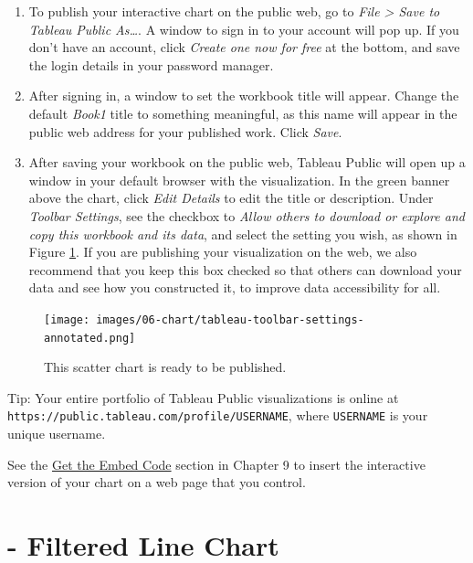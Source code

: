 \documentclass[
  english,
]{book}
\begin{document}
\begin{enumerate}
\def\labelenumi{\arabic{enumi}.}
\item
  To publish your interactive chart on the public web, go to \emph{File \textgreater{} Save to Tableau Public As\ldots{}}. A window to sign in to your account will pop up. If you don't have an account, click \emph{Create one now for free} at the bottom, and save the login details in your password manager.
\item
  After signing in, a window to set the workbook title will appear. Change the default \emph{Book1} title
  to something meaningful, as this name will appear in the public web address for your published work. Click \emph{Save}.
\item
  After saving your workbook on the public web, Tableau Public will open up a window in your default browser
  with the visualization. In the green banner above the chart, click \emph{Edit Details} to edit the title or description. Under \emph{Toolbar Settings}, see the checkbox to \emph{Allow others to download or explore and copy this workbook and its data}, and select the setting you wish, as shown in Figure \ref{fig:tableau-toolbar-settings}. If you are publishing your visualization on the web, we also recommend that you keep this box checked so that others can download your data and see how you constructed it, to improve data accessibility for all.
\end{enumerate}



\begin{figure}
\centering
\texttt{[image: images/06-chart/tableau-toolbar-settings-annotated.png]}
\caption{\label{fig:tableau-toolbar-settings}This scatter chart is ready to be published.}
\end{figure}

Tip: Your entire portfolio of Tableau Public visualizations is online at \texttt{https://public.tableau.com/profile/USERNAME},
where \texttt{USERNAME} is your unique username.

See the \href{embed-code.html}{Get the Embed Code} section in Chapter 9 to insert the interactive version of your chart on a web page that you control.

\hypertarget{filtered-line-tableau}{%
\section*{- Filtered Line Chart}\label{filtered-line-tableau}}
\end{document}
